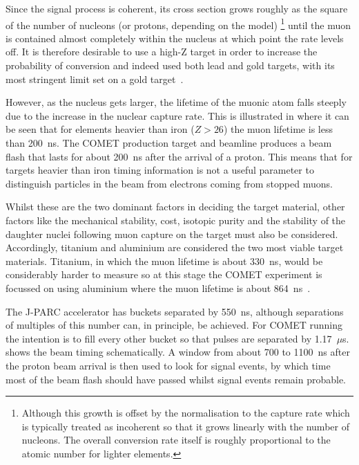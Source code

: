 Since the signal process is coherent, its cross section grows roughly as the square of the number of nucleons (or protons, depending on the model)%
\footnote{Although this growth is offset by the normalisation to the capture rate which is typically treated as incoherent so that it grows linearly with the number of nucleons.  The overall conversion rate itself is roughly proportional to the atomic number for lighter elements.}
until the muon is contained almost completely within the nucleus at which point the rate levels off.
It is therefore desirable to use a high-Z target in order to increase the probability of conversion and indeed \sindrumII used both lead and gold targets, with its most stringent limit set on a gold target~\cite{sindrum2006}.

However, as the nucleus gets larger, the lifetime of the muonic atom falls steeply due to the increase in the nuclear capture rate.
This is illustrated in  where it can be seen that for elements heavier than iron ($Z>26$) the muon lifetime is less than 200~ns.
The COMET production target and beamline produces a beam flash that lasts for about 200~ns after the arrival of a proton.
This means that for targets heavier than iron timing information is not a useful parameter to distinguish particles in the beam from electrons coming from stopped muons.

Whilst these are the two dominant factors in deciding the target material, other factors like the mechanical stability, cost, isotopic purity and the stability of the daughter nuclei following muon capture on the target must also be considered.
Accordingly, titanium and aluminium are considered the two most viable target materials.  
Titanium, in which the muon lifetime is about 330~ns, would be considerably harder to measure \mueconv so at this stage the COMET experiment is focussed on using aluminium where the muon lifetime is about 864~ns~\cite{Suzuki1987}.

\FigTimingSchematic

The J-PARC accelerator has buckets separated by 550~ns, although separations of multiples of this number can, in principle, be achieved.
For COMET running the intention is to fill every other bucket so that pulses are separated by 1.17~$\mu$s.
 shows the beam timing schematically.  
A window from about 700 to 1100~ns after the proton beam arrival is then used to look for signal events, by which time most of the beam flash should have passed whilst signal events remain probable.

